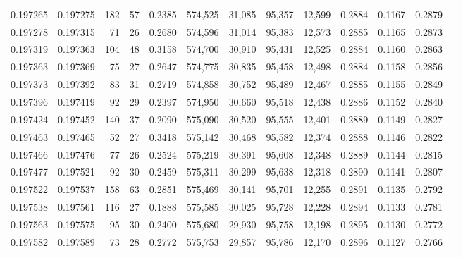 \begin{tabular}{rrrrrrrrrrrrr}
0.197265 & 0.197275 &   182 &  57 &                                     0.2385 & 574,525 &  31,085 &  95,357 &  12,599 & 0.2884 & 0.1167 & 0.2879 \\
0.197278 & 0.197315 &    71 &  26 &                                     0.2680 & 574,596 &  31,014 &  95,383 &  12,573 & 0.2885 & 0.1165 & 0.2873 \\
0.197319 & 0.197363 &   104 &  48 &                                     0.3158 & 574,700 &  30,910 &  95,431 &  12,525 & 0.2884 & 0.1160 & 0.2863 \\
0.197363 & 0.197369 &    75 &  27 &                                     0.2647 & 574,775 &  30,835 &  95,458 &  12,498 & 0.2884 & 0.1158 & 0.2856 \\
0.197373 & 0.197392 &    83 &  31 &                                     0.2719 & 574,858 &  30,752 &  95,489 &  12,467 & 0.2885 & 0.1155 & 0.2849 \\
0.197396 & 0.197419 &    92 &  29 &                                     0.2397 & 574,950 &  30,660 &  95,518 &  12,438 & 0.2886 & 0.1152 & 0.2840 \\
0.197424 & 0.197452 &   140 &  37 &                                     0.2090 & 575,090 &  30,520 &  95,555 &  12,401 & 0.2889 & 0.1149 & 0.2827 \\
0.197463 & 0.197465 &    52 &  27 &                                     0.3418 & 575,142 &  30,468 &  95,582 &  12,374 & 0.2888 & 0.1146 & 0.2822 \\
0.197466 & 0.197476 &    77 &  26 &                                     0.2524 & 575,219 &  30,391 &  95,608 &  12,348 & 0.2889 & 0.1144 & 0.2815 \\
0.197477 & 0.197521 &    92 &  30 &                                     0.2459 & 575,311 &  30,299 &  95,638 &  12,318 & 0.2890 & 0.1141 & 0.2807 \\
0.197522 & 0.197537 &   158 &  63 &                                     0.2851 & 575,469 &  30,141 &  95,701 &  12,255 & 0.2891 & 0.1135 & 0.2792 \\
0.197538 & 0.197561 &   116 &  27 &                                     0.1888 & 575,585 &  30,025 &  95,728 &  12,228 & 0.2894 & 0.1133 & 0.2781 \\
0.197563 & 0.197575 &    95 &  30 &                                     0.2400 & 575,680 &  29,930 &  95,758 &  12,198 & 0.2895 & 0.1130 & 0.2772 \\
0.197582 & 0.197589 &    73 &  28 &                                     0.2772 & 575,753 &  29,857 &  95,786 &  12,170 & 0.2896 & 0.1127 & 0.2766 \\

\end{tabular}
